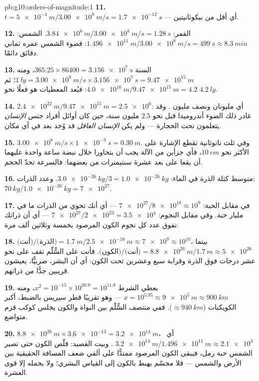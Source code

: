 \begin{solution}{pb:g10:orders-of-magnitude:1}
\textbf{11.} $t = \qty{5e-4}{m}/\qty{3.00e8}{m/s} = \qty{1.7e-12}{s}$
--- أي أقل من بيكوثانيتين.

\textbf{12.} القمر: $\qty{3.84e8}{m}/\qty{3.00e8}{m/s} =
\qty{1.28}{s}$. الشمس: $\qty{1.496e11}{m}/\qty{3.00e8}{m/s} =
\qty{499}{s} \approx \qty{8.3}{min}$: فضوء الشمس عمره ثماني دقائق
دائمًا.

\textbf{13.} السنة $365.25 \times 86400 = \qty{3.156e7}{s}$، ومنه
$\qty{1}{ly} = \qty{3.00e8}{m/s} \times \qty{3.156e7}{s}
= \qty{9.47e15}{m}$؛ ثم
$\qty{4.0e16}{m}/\qty{9.47e15}{m} = 4.2$: فبُعد المعطيات هو فعلًا
نحو $\qty{4.2}{ly}$.

\textbf{14.} $\qty{2.4e22}{m}/\qty{9.47e15}{m} = \num{2.5e6}$: أي
مليونان ونصف مليون . وقد غادر ذلك الضوء أندروميدا قبل نحو $2.5$
مليون سنة، حين كان أوائل أفراد جنس \emph{الإنسان}
يتعلمون نحت الحجارة --- ولم يكن \emph{الإنسان العاقل} قد
وُجد بعد في أي مكان.

\textbf{15.} $\qty{3.00e8}{m/s} \times \qty{1e-9}{s} = \qty{0.30}{m}$.
وفي ثلث نانوثانية تقطع الإشارة على الأكثر نحو
$\qty{10}{cm}$، فأي جزأين من الآلة يجب أن يتحاورا خلال
نبضة ساعة واحدة عليهما أن يقعا على بعد عشرة سنتيمترات من بعضهما:
فالسرعة تحدّ الحجم.

\textbf{16.} متوسط كتلة الذرة في الماء:
$\qty{3.0e-26}{kg}/3 = \qty{1.0e-26}{kg}$. وعدد الذرات:
$\qty{70}{kg}/\qty{1.0e-26}{kg} = \num{7e27}$.

\textbf{17.} في مقابل الحبة:
$\num{7e27}/\num{8e18} \approx 10^{9}$ --- أي أنك تحوي من الذرات ما
في مليار حبة. وفي مقابل النجوم:
$\num{7e27}/\num{2e23} = \num{3.5e4}$ --- أي أن ذراتك تفوق عدد كل
نجوم الكون المرصود بخمسة وثلاثين ألف مرة.

\textbf{18.} $\text{(أنت)}/\text{(الذرة)} =
\qty{1.7}{m}/\qty{2.5e-10}{m} \approx \num{7e9} \approx 10^{10}$،
بينما $\text{(الكون)}/\text{(أنت)} =
\qty{8.8e26}{m}/\qty{1.7}{m} \approx \num{5e26}$. فأنت على السُّلّم
تقف على نحو عشر درجات فوق الذرة وقرابة سبع وعشرين تحت
الكون: أي أن البشر، ضربيًّا، يعيشون قريبين جدًّا من ذراتهم.

\textbf{19.} يعطي الشرط
$x^{2} = 10^{-15} \times 10^{26.9} = 10^{11.9}$، ومنه
$x = 10^{5.95} \approx \qty{9e5}{m} \approx \qty{900}{km}$ --- وهو تقريبًا
قطر سيريس بالضبط، أكبر الكويكبات
($\approx \qty{940}{km}$). ففي منتصف السُّلّم بين النواة
والكون يجلس كوكب قزم متواضع.

\textbf{20.} $\qty{8.8e26}{m} \times \num{3.6e-13} = \qty{3.2e14}{m}$،
أي\ $\qty{3.2e14}{m}/\qty{1.496e11}{m} \approx \num{2.1e3}$
. وبيت القصيد: قلّص الكون حتى تصير الشمس
حبة رمل، فيبقى الكون المرصود ممتدًّا على ألفي ضعف
المسافة الحقيقية بين الأرض والشمس --- فلا مجسّم يهبط
بالكون إلى القياس البشري؛ ولا يحمله إلا قوى العشرة.
\end{solution}
